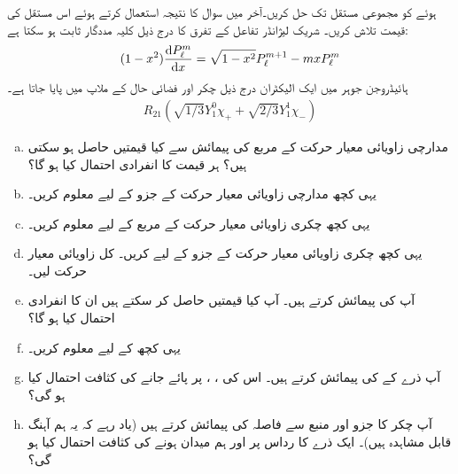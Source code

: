  ہوئے  کو مجموعی مستقل  تک حل کریں۔آخر میں سوال  کا نتیجہ استعمال کرتے ہوئے اس مستقل کی قیمت تلاش کریں۔ شریک لیژانڈر تفاعل کے تفرق کا درج ذیل کلیہ مددگار ثابت ہو سکتا ہے:
\begin{align}
 (1-x^{2})\frac{ \dif P_{\ell}^{m}} {\dif x}=\sqrt{1-x^{2}} P_{\ell}^{m+1}-mxP_{\ell}^{m}
\end{align}
ہائیڈروجن جوہر میں ایک الیکٹران درج ذیل چکر اور فضائی حال کے ملاپ میں پایا جاتا ہے۔
\begin{align*}
 R_{21}(\sqrt{1/3}Y_{1}^{0}\chi_+ + \sqrt{2/3}Y_{1}^{1}\chi_-)
\end{align*} 
\begin{enumerate}[a.]
\item
 مدارچی زاویائی معیار حرکت کے مربع  کی پیمائش سے کیا قیمتیں حاصل ہو سکتی ہیں؟ ہر قیمت کا انفرادی احتمال کیا ہو گا؟ 
\item 
یہی کچھ مدارچی زاویائی معیار حرکت کے  جزو  کے لیے معلوم کریں۔
\item 
یہی کچھ چکری زاویائی معیار حرکت کے مربع  کے لیے معلوم کریں۔
\item
 یہی کچھ چکری زاویائی معیار حرکت کے  جزو  کے لیے کریں۔ کل زاویائی معیار حرکت  لیں۔
\item
 آپ  کی پیمائش کرتے ہیں۔ آپ کیا قیمتیں حاصل کر سکتے ہیں ان کا انفرادی احتمال کیا ہو گا؟
\item
 یہی کچھ  کے لیے معلوم کریں۔
\item
 آپ ذرے کے  کی پیمائش کرتے ہیں۔ اس کی ، ،  پر پائے جانے کی کثافت احتمال کیا ہو گی؟ 
\item
 آپ چکر کا  جزو اور منبع سے فاصلہ کی پیمائش کرتے ہیں (یاد رہے کہ یہ ہم آہنگ قابل مشاہدہ ہیں)۔ ایک ذرے کا رداس  پر اور ہم میدان ہونے کی کثافت احتمال کیا ہو گی؟ 
\end{enumerate}

